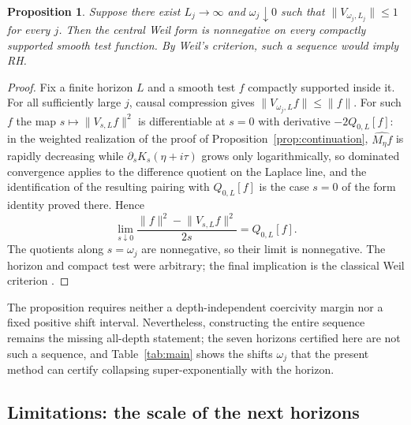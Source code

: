 \documentclass[11pt]{article}
\numberwithin{equation}{section}
\newtheorem{proposition}[theorem]{Proposition}
\theoremstyle{definition}
\theoremstyle{remark}
\newcommand{\norm}[1]{\lVert#1\rVert}
\begin{document}
\begin{proposition}\label{prop:diagonal}
Suppose there exist $L_j\to\infty$ and $\omega_j\downarrow0$ such that
$\norm{V_{\omega_j,L_j}}\le1$ for every $j$. Then the central Weil form
is nonnegative on every compactly supported smooth test function.
By Weil's criterion, such a sequence would imply RH.
\end{proposition}
\begin{proof}
Fix a finite horizon $L$ and a smooth test $f$ compactly supported inside it.
For all sufficiently large $j$, causal compression gives
$\norm{V_{\omega_j,L}f}\le\norm f$.
For such $f$ the map $s\mapsto\norm{V_{s,L}f}^2$ is differentiable at $s=0$
with derivative $-2Q_{0,L}[f]$: in the weighted realization of the proof of
Proposition~\ref{prop:continuation}, $\widehat{M_\eta f}$ is rapidly
decreasing while $\partial_sK_s(\eta+i\tau)$ grows only logarithmically, so
dominated convergence applies to the difference quotient on the Laplace line,
and the identification of the resulting pairing with $Q_{0,L}[f]$ is the case
$s=0$ of the form identity proved there. Hence
\[
 \lim_{s\downarrow0}\frac{\norm f^2-\norm{V_{s,L}f}^2}{2s}
 =Q_{0,L}[f].
\]
The quotients along $s=\omega_j$ are nonnegative, so their limit is
nonnegative. The horizon and compact test were arbitrary; the final
implication is the classical Weil criterion
\cite{ConnesConsani2020,Conrey2019}.
\end{proof}

The proposition requires neither a depth-independent coercivity margin nor
a fixed positive shift interval. Nevertheless, constructing the entire
sequence remains the missing all-depth statement; the seven horizons certified
here are not such a sequence, and Table~\ref{tab:main} shows the shifts
$\omega_j$ that the present method can certify collapsing super-exponentially
with the horizon.

\subsection{Limitations: the scale of the next horizons}\label{sec:limits}
\end{document}
